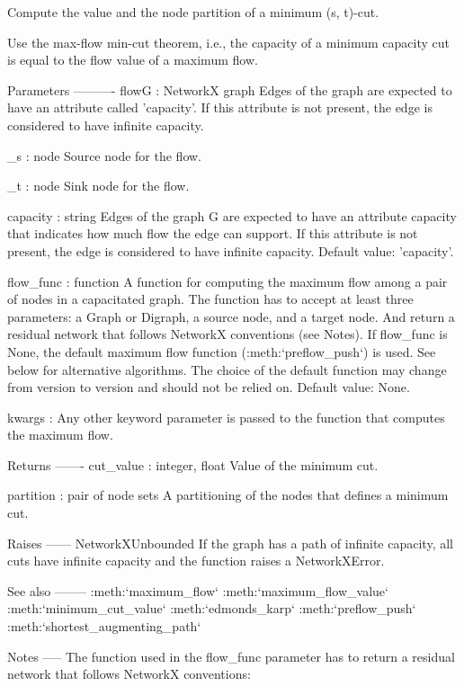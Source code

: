 \begin{DoxyVerb}Compute the value and the node partition of a minimum (s, t)-cut.

Use the max-flow min-cut theorem, i.e., the capacity of a minimum
capacity cut is equal to the flow value of a maximum flow.

Parameters
----------
flowG : NetworkX graph
    Edges of the graph are expected to have an attribute called
    'capacity'. If this attribute is not present, the edge is
    considered to have infinite capacity.

_s : node
    Source node for the flow.

_t : node
    Sink node for the flow.

capacity : string
    Edges of the graph G are expected to have an attribute capacity
    that indicates how much flow the edge can support. If this
    attribute is not present, the edge is considered to have
    infinite capacity. Default value: 'capacity'.

flow_func : function
    A function for computing the maximum flow among a pair of nodes
    in a capacitated graph. The function has to accept at least three
    parameters: a Graph or Digraph, a source node, and a target node.
    And return a residual network that follows NetworkX conventions
    (see Notes). If flow_func is None, the default maximum
    flow function (:meth:`preflow_push`) is used. See below for
    alternative algorithms. The choice of the default function may change
    from version to version and should not be relied on. Default value:
    None.

kwargs : Any other keyword parameter is passed to the function that
    computes the maximum flow.

Returns
-------
cut_value : integer, float
    Value of the minimum cut.

partition : pair of node sets
    A partitioning of the nodes that defines a minimum cut.

Raises
------
NetworkXUnbounded
    If the graph has a path of infinite capacity, all cuts have
    infinite capacity and the function raises a NetworkXError.

See also
--------
:meth:`maximum_flow`
:meth:`maximum_flow_value`
:meth:`minimum_cut_value`
:meth:`edmonds_karp`
:meth:`preflow_push`
:meth:`shortest_augmenting_path`

Notes
-----
The function used in the flow_func parameter has to return a residual
network that follows NetworkX conventions:


\end{DoxyVerb}
